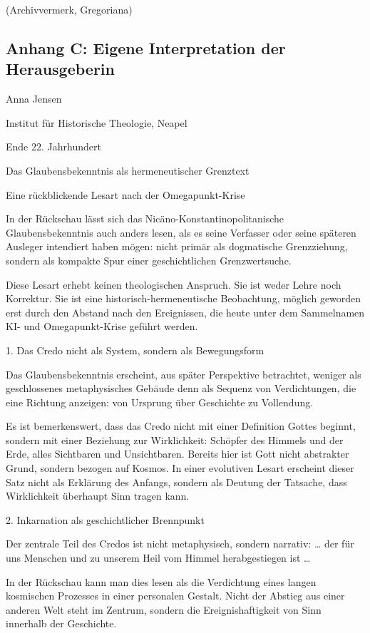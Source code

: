 \documentclass[
  ngerman,
]{article}
\begin{document}
(Archivvermerk, Gregoriana)

\subsection{Anhang C: Eigene Interpretation der
Herausgeberin}\label{anhang-c-eigene-interpretation-der-herausgeberin}

Anna Jensen

Institut für Historische Theologie, Neapel

Ende 22. Jahrhundert

Das Glaubensbekenntnis als hermeneutischer Grenztext

Eine rückblickende Lesart nach der Omegapunkt-Krise

In der Rückschau lässt sich das Nicäno-Konstantinopolitanische
Glaubensbekenntnis auch anders lesen, als es seine Verfasser oder seine
späteren Ausleger intendiert haben mögen: nicht primär als dogmatische
Grenzziehung, sondern als kompakte Spur einer geschichtlichen
Grenzwertsuche.

Diese Lesart erhebt keinen theologischen Anspruch. Sie ist weder Lehre
noch Korrektur. Sie ist eine historisch-hermeneutische Beobachtung,
möglich geworden erst durch den Abstand nach den Ereignissen, die heute
unter dem Sammelnamen KI- und Omegapunkt-Krise geführt werden.

1. Das Credo nicht als System, sondern als Bewegungsform

Das Glaubensbekenntnis erscheint, aus später Perspektive betrachtet,
weniger als geschlossenes metaphysisches Gebäude denn als Sequenz von
Verdichtungen, die eine Richtung anzeigen: von Ursprung über Geschichte
zu Vollendung.

Es ist bemerkenswert, dass das Credo nicht mit einer Definition Gottes
beginnt, sondern mit einer Beziehung zur Wirklichkeit: Schöpfer des
Himmels und der Erde, alles Sichtbaren und Unsichtbaren. Bereits hier
ist Gott nicht abstrakter Grund, sondern bezogen auf Kosmos. In einer
evolutiven Lesart erscheint dieser Satz nicht als Erklärung des Anfangs,
sondern als Deutung der Tatsache, dass Wirklichkeit überhaupt Sinn
tragen kann.

2. Inkarnation als geschichtlicher Brennpunkt

Der zentrale Teil des Credos ist nicht metaphysisch, sondern narrativ:
\ldots{} der für uns Menschen und zu unserem Heil vom Himmel
herabgestiegen ist \ldots{}

In der Rückschau kann man dies lesen als die Verdichtung eines langen
kosmischen Prozesses in einer personalen Gestalt. Nicht der Abstieg aus
einer anderen Welt steht im Zentrum, sondern die Ereignishaftigkeit von
Sinn innerhalb der Geschichte.
\end{document}
